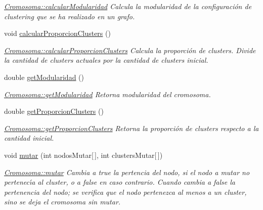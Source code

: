 \begin{DoxyCompactItemize}
\begin{DoxyCompactList}\small\item\em \hyperlink{class_cromosoma_ac331434df88dfd7cdebee472381ff106}{Cromosoma\-::calcular\-Modularidad} Calcula la modularidad de la configuraci\'{o}n de {\itshape clustering} que se ha realizado en un grafo. \end{DoxyCompactList}\item 
void \hyperlink{class_cromosoma_ae00d281b447cf12042269174e586fb8b}{calcular\-Proporcion\-Clusters} ()
\begin{DoxyCompactList}\small\item\em \hyperlink{class_cromosoma_ae00d281b447cf12042269174e586fb8b}{Cromosoma\-::calcular\-Proporcion\-Clusters} Calcula la proporci\'{o}n de {\itshape clusters}. Divide la cantidad de {\itshape clusters} actuales por la cantidad de {\itshape clusters} inicial. \end{DoxyCompactList}\item 
double \hyperlink{class_cromosoma_a2939af9ae57532c5800a7d4cc7933095}{get\-Modularidad} ()
\begin{DoxyCompactList}\small\item\em \hyperlink{class_cromosoma_a2939af9ae57532c5800a7d4cc7933095}{Cromosoma\-::get\-Modularidad} Retorna modularidad del cromosoma. \end{DoxyCompactList}\item 
double \hyperlink{class_cromosoma_a1ff8e03e985f2eccd5ac4bb2b2b09a43}{get\-Proporcion\-Clusters} ()
\begin{DoxyCompactList}\small\item\em \hyperlink{class_cromosoma_a1ff8e03e985f2eccd5ac4bb2b2b09a43}{Cromosoma\-::get\-Proporcion\-Clusters} Retorna la proporci\'{o}n de {\itshape clusters} respecto a la cantidad inicial. \end{DoxyCompactList}\item 
void \hyperlink{class_cromosoma_ad559093928da2dedca134f097c1e08a0}{mutar} (int nodos\-Mutar\mbox{[}$\,$\mbox{]}, int clusters\-Mutar\mbox{[}$\,$\mbox{]})
\begin{DoxyCompactList}\small\item\em \hyperlink{class_cromosoma_ad559093928da2dedca134f097c1e08a0}{Cromosoma\-::mutar} Cambia a {\itshape true} la pertencia del nodo, si el nodo a mutar no pertenec\'{\i}a al {\itshape cluster}, o a {\itshape false} en caso contrario. Cuando cambia a {\itshape false} la pertenencia del nodo; se verifica que el nodo pertenezca al menos a un {\itshape cluster}, sino se deja el cromosoma sin mutar. \end{DoxyCompactList}\item 

\end{DoxyCompactItemize}
